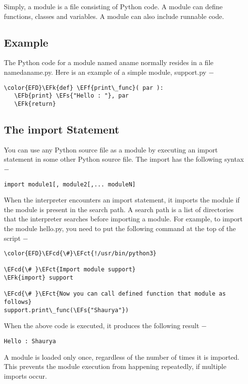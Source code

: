 \documentclass{scrartcl}
\newcommand{\EFk}[1]{\textcolor{EFk}{#1}} %
\newcommand{\EFs}[1]{\textcolor{EFs}{#1}} %
\newcommand{\EFb}[1]{\textcolor{EFb}{#1}} %
\newcommand{\EFct}[1]{\textcolor{EFct}{#1}} %
\newcommand{\EFf}[1]{\textcolor{EFf}{#1}} %
\newcommand{\EFcd}[1]{\textcolor{EFcd}{#1}} %
\begin{document}
Simply, a module is a file consisting of Python code. A module can define functions, classes and variables. A module can also include runnable code.

\subsection{Example}
\label{sec:org7f226e5}
The Python code for a module named aname normally resides in a file namedaname.py. Here is an example of a simple module, support.py −

\begin{Code}
\begin{Verbatim}[]
\color{EFD}\EFk{def} \EFf{print\_func}( par ):
   \EFb{print} \EFs{"Hello : "}, par
   \EFk{return}
\end{Verbatim}
\end{Code}

\subsection{The import Statement}
\label{sec:org4f7ab43}
You can use any Python source file as a module by executing an import statement in some other Python source file. The import has the following syntax −

\texttt{import module1[, module2[,... moduleN]}

When the interpreter encounters an import statement, it imports the module if the module is present in the search path. A search path is a list of directories that the interpreter searches before importing a module. For example, to import the module hello.py, you need to put the following command at the top of the script −

\begin{Code}
\begin{Verbatim}[]
\color{EFD}\EFcd{\#}\EFct{!/usr/bin/python3}

\EFcd{\# }\EFct{Import module support}
\EFk{import} support

\EFcd{\# }\EFct{Now you can call defined function that module as follows}
support.print\_func(\EFs{"Shaurya"})
\end{Verbatim}
\end{Code}

When the above code is executed, it produces the following result −

\texttt{Hello : Shaurya}

A module is loaded only once, regardless of the number of times it is imported. This prevents the module execution from happening repeatedly, if multiple imports occur.
\end{document}
